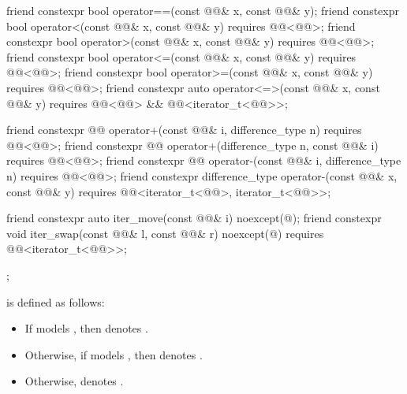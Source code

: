 \begin{codeblock}
{{    friend constexpr bool operator==(const @@& x, const @@& y);
    friend constexpr bool operator<(const @@& x, const @@& y)
      requires @@<@@>;
    friend constexpr bool operator>(const @@& x, const @@& y)
      requires @@<@@>;
    friend constexpr bool operator<=(const @@& x, const @@& y)
      requires @@<@@>;
    friend constexpr bool operator>=(const @@& x, const @@& y)
      requires @@<@@>;
    friend constexpr auto operator<=>(const @@& x, const @@& y)
      requires @@<@@> &&
               @@<iterator_t<@@>>;

    friend constexpr @@ operator+(const @@& i, difference_type n)
      requires @@<@@>;
    friend constexpr @@ operator+(difference_type n, const @@& i)
      requires @@<@@>;
    friend constexpr @@ operator-(const @@& i, difference_type n)
      requires @@<@@>;
    friend constexpr difference_type operator-(const @@& x, const @@& y)
      requires @@<iterator_t<@@>, iterator_t<@@>>;

    friend constexpr auto iter_move(const @@& i) noexcept(@\seebelow@);
    friend constexpr void iter_swap(const @@& l, const @@& r) noexcept(@\seebelow@)
      requires @@<iterator_t<@@>>;
  };
}
\end{codeblock}

\pnum
{} is defined as follows:
\begin{itemize}
\item
If  models ,
then  denotes .
\item
Otherwise, if  models ,
then  denotes .
\item
Otherwise,  denotes .
\end{itemize}

